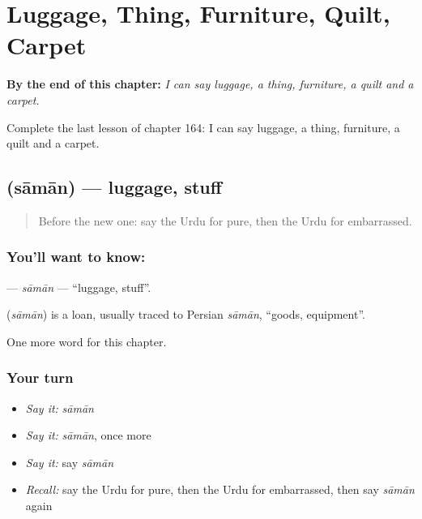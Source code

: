
\chapter{Luggage, Thing, Furniture, Quilt, Carpet}
\label{ch:ur-luggage-thing-furniture-quilt-carpet}

\begin{chapteropening}
\textbf{By the end of this chapter:} \emph{I can say luggage, a thing, furniture, a quilt and a carpet.}

Complete the last lesson of chapter 164: I can say luggage, a thing, furniture, a quilt and a carpet.
\end{chapteropening}

\section[\texorpdfstring{\ur{سامان} (sāmān)}{سامان (sāmān)}]{ (sāmān) — luggage, stuff}

\label{lesson:UR-C164-saman}



\begin{quote}
Before the new one: say the Urdu for pure, then the Urdu for embarrassed.
\end{quote}

\subsection*{You'll want to know: }
\textbf{} — \emph{sāmān} — \textquotedblleft{}luggage, stuff\textquotedblright{}.

\begin{cousinweb}
\textbf{} (\emph{sāmān}) is a loan, usually traced to Persian \emph{sāmān}, \textquotedblleft{}goods, equipment\textquotedblright{}.
\end{cousinweb}

\begin{grammarlens}[title={What you've built}]
One more word for this chapter.
\end{grammarlens}

\subsection*{Your turn}
\begin{itemize}
\raggedright
  \item \emph{Say it:} \emph{sāmān}
  \item \emph{Say it:} \emph{sāmān}, once more
  \item \emph{Say it:} say \emph{sāmān}
  \item \emph{Recall:} say the Urdu for pure, then the Urdu for embarrassed, then say \emph{sāmān} again
\end{itemize}

